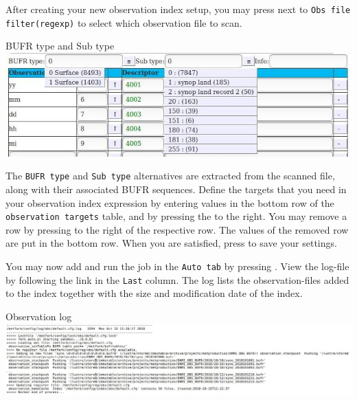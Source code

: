 \documentclass[letterpaper,10pt,twoside,twocolumn,openany]{book}
\begin{document}
{After creating your new observation index setup, 
you may press  next to
\lstinline!Obs file filter(regexp)! to select which observation file to scan.
\begin{paperbox}{BUFR type and Sub type}
  \includegraphics[width=\columnwidth]{how_obs.jpg}
\end{paperbox}
The \lstinline!BUFR type! and \lstinline!Sub type! alternatives are extracted from the scanned file,
along with their associated BUFR sequences.
Define the targets that you need in your observation index expression by entering values
in the bottom row of the \lstinline!observation targets! table, and by pressing the  to the right.
You may remove a row by pressing   to the right of the respective row.
The values of the removed row are put in the bottom row.
When you are satisfied, press  to save your settings.

You may now add and run the job in the \lstinline!Auto tab! by pressing . View the log-file by following the link in  the \lstinline!Last! column. The log lists the observation-files added to the index together with the size and modification date of the index.
\begin{paperbox}{Observation log}
  \includegraphics[width=\columnwidth]{obslog.jpg}
\end{paperbox}

}
\end{document}
